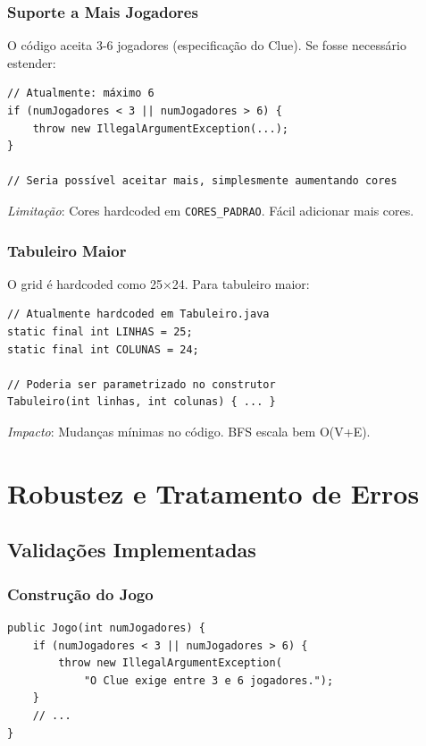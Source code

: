 \documentclass[12pt,a4paper]{report}
\begin{document}
\subsection{Suporte a Mais Jogadores}

O código aceita 3-6 jogadores (especificação do Clue). Se fosse necessário estender:

\begin{lstlisting}
// Atualmente: máximo 6
if (numJogadores < 3 || numJogadores > 6) {
    throw new IllegalArgumentException(...);
}

// Seria possível aceitar mais, simplesmente aumentando cores
\end{lstlisting}

\textit{Limitação}: Cores hardcoded em \texttt{CORES\_PADRAO}. Fácil adicionar mais cores.

\subsection{Tabuleiro Maior}

O grid é hardcoded como 25×24. Para tabuleiro maior:

\begin{lstlisting}
// Atualmente hardcoded em Tabuleiro.java
static final int LINHAS = 25;
static final int COLUNAS = 24;

// Poderia ser parametrizado no construtor
Tabuleiro(int linhas, int colunas) { ... }
\end{lstlisting}

\textit{Impacto}: Mudanças mínimas no código. BFS escala bem O(V+E).

\chapter{Robustez e Tratamento de Erros}

\section{Validações Implementadas}

\subsection{Construção do Jogo}

\begin{lstlisting}
public Jogo(int numJogadores) {
    if (numJogadores < 3 || numJogadores > 6) {
        throw new IllegalArgumentException(
            "O Clue exige entre 3 e 6 jogadores.");
    }
    // ...
}
\end{lstlisting}
\end{document}

